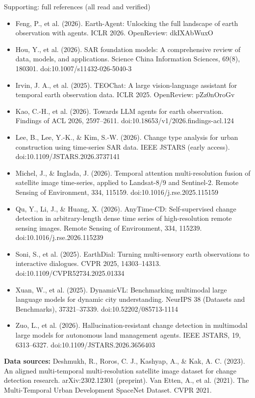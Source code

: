\documentclass[aspectratio=169,11pt]{beamer}
\begin{document}
\appendix
\begin{frame}[shrink=10]{Supporting: full references (all read and verified)}
\scriptsize
\begin{itemize}
\item Feng, P., et al. (2026). Earth-Agent: Unlocking the full landscape of earth observation with agents. ICLR 2026. OpenReview: dkIXAbWuxO
\item Hou, Y., et al. (2026). SAR foundation models: A comprehensive review of data, models, and applications. Science China Information Sciences, 69(8), 180301. doi:10.1007/s11432-026-5040-3
\item Irvin, J. A., et al. (2025). TEOChat: A large vision-language assistant for temporal earth observation data. ICLR 2025. OpenReview: pZz0nOroGv
\item Kao, C.-H., et al. (2026). Towards LLM agents for earth observation. Findings of ACL 2026, 2597--2611. doi:10.18653/v1/2026.findings-acl.124
\item Lee, B., Lee, Y.-K., \& Kim, S.-W. (2026). Change type analysis for urban construction using time-series SAR data. IEEE JSTARS (early access). doi:10.1109/JSTARS.2026.3737141
\item Michel, J., \& Inglada, J. (2026). Temporal attention multi-resolution fusion of satellite image time-series, applied to Landsat-8/9 and Sentinel-2. Remote Sensing of Environment, 334, 115159. doi:10.1016/j.rse.2025.115159
\item Qu, Y., Li, J., \& Huang, X. (2026). AnyTime-CD: Self-supervised change detection in arbitrary-length dense time series of high-resolution remote sensing images. Remote Sensing of Environment, 334, 115239. doi:10.1016/j.rse.2026.115239
\item Soni, S., et al. (2025). EarthDial: Turning multi-sensory earth observations to interactive dialogues. CVPR 2025, 14303--14313. doi:10.1109/CVPR52734.2025.01334
\item Xuan, W., et al. (2025). DynamicVL: Benchmarking multimodal large language models for dynamic city understanding. NeurIPS 38 (Datasets and Benchmarks), 37321--37339. doi:10.52202/085713-1114
\item Zuo, L., et al. (2026). Hallucination-resistant change detection in multimodal large models for autonomous land management agents. IEEE JSTARS, 19, 6313--6327. doi:10.1109/JSTARS.2026.3656403
\end{itemize}
\textbf{Data sources:} Deshmukh, R., Roros, C. J., Kashyap, A., \& Kak, A. C. (2023). An aligned multi-temporal multi-resolution satellite image dataset for change detection research. arXiv:2302.12301 (preprint). \enskip Van Etten, A., et al. (2021). The Multi-Temporal Urban Development SpaceNet Dataset. CVPR 2021.
\end{frame}
\end{document}
